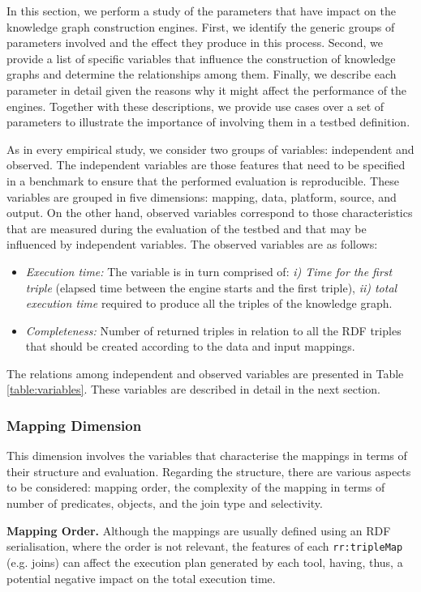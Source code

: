 In this section, we perform a study of the parameters that have impact on the knowledge graph construction engines. First, we identify the generic groups of parameters involved and the effect they produce in this process. Second, we provide a list of specific variables that influence the construction of knowledge graphs and determine the relationships among them. Finally, we describe each parameter in detail given the reasons why it might affect the performance of the engines. Together with these descriptions, we provide use cases over a set of parameters to illustrate the importance of involving them in a testbed definition.

As in every empirical study, we consider two groups of variables: independent and observed. The independent variables are those features that need to be specified in a benchmark to ensure that the performed evaluation is reproducible. These variables are grouped in five dimensions: mapping, data, platform, source, and output.
On the other hand, observed variables correspond to those characteristics that are measured during the evaluation of the testbed and that may be influenced by independent variables. The observed variables are as follows:
\begin{itemize}
    \item \textit{Execution time:} The variable is in turn comprised of: \textit{i) Time for the first triple} (elapsed time between the engine starts and the first triple), \textit{ii) total execution time} required to produce all the triples of the knowledge graph.
    \item \textit{Completeness:} Number of returned triples in relation to all the RDF triples that should be created according to the data and input mappings.
\end{itemize}
The relations among independent and observed variables are presented in Table \ref{table:variables}. These variables are described in detail in the next section. 


\subsubsection{Mapping Dimension}
This dimension involves the variables that characterise the mappings in terms of their structure and evaluation. Regarding the structure, there are various aspects to be considered: mapping order, the complexity of the mapping in terms of number of predicates, objects, and the join type and selectivity.

\noindent \textbf{Mapping Order.} Although the mappings are usually defined using an RDF serialisation, where the order is not relevant, the features of each \texttt{rr:tripleMap} (e.g. joins) can affect the execution plan generated by each tool, having, thus, a potential negative impact on the total execution time.


